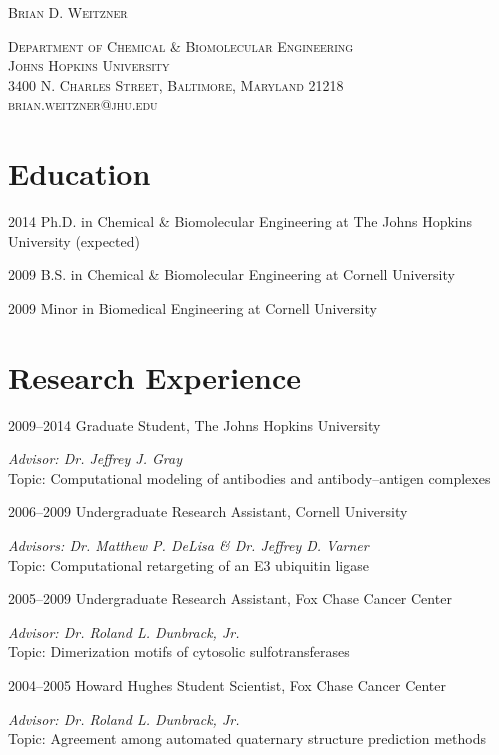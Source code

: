 \documentclass[12pt]{scrartcl}
\begin{document}
\begin{center}
\Large{\lsstyle \textsc{Brian D. Weitzner}}

\normalsize{\lsstyle \textsc{Department of Chemical \& Biomolecular Engineering \\
Johns Hopkins University \\
3400 N. Charles Street, Baltimore, Maryland 21218 \\
\vspace{0.25\baselineskip}
brian.weitzner@jhu.edu}}
\end{center}

\section{\lsstyle Education}

\begin{CV}
\item[2014] Ph.D. in Chemical \& Biomolecular Engineering at The Johns Hopkins University (expected)
\item[2009] B.S. in Chemical \& Biomolecular Engineering at Cornell University
\item[2009] Minor in Biomedical Engineering at Cornell University
\end{CV}

\section{\lsstyle Research Experience}
\begin{CV}
\item[2009--2014] Graduate Student, The Johns Hopkins University

\emph{Advisor: Dr. Jeffrey J. Gray} \\
Topic: Computational modeling of antibodies and antibody--antigen complexes

\item[2006--2009] Undergraduate Research Assistant, Cornell University

\emph{Advisors: Dr. Matthew P. DeLisa \& Dr. Jeffrey D. Varner} \\
Topic: Computational retargeting of an E3 ubiquitin ligase

\item[2005--2009] Undergraduate Research Assistant, Fox Chase Cancer Center

\emph{Advisor: Dr. Roland L. Dunbrack, Jr.} \\
Topic: Dimerization motifs of cytosolic sulfotransferases

\item[2004--2005] Howard Hughes Student Scientist, Fox Chase Cancer Center

\emph{Advisor: Dr. Roland L. Dunbrack, Jr.} \\
Topic: Agreement among automated quaternary structure prediction methods
\end{CV}
\end{document}
